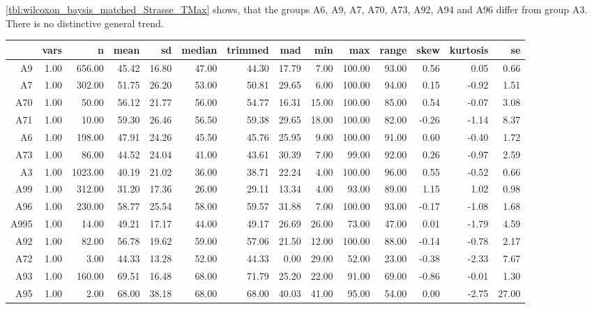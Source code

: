 \cref{tbl:wilcoxon_baysis_matched_Strasse_TMax} shows, that the groups A6, A9, A7, A70, A73, A92, A94 and A96 differ from group A3. There is no distinctive general trend.
\begin{table}[ht!]
	\tiny
	\centering
  \begin{tabular}{rrrrrrrrrrrrrr}
    \hline
    & vars & n & mean & sd & median & trimmed & mad & min & max & range & skew & kurtosis & se \\ 
    \hline
    A9   & 1.00 & 656.00 & 45.42 & 16.80 & 47.00 & 44.30 & 17.79 & 7.00 & 100.00 & 93.00 & 0.56 & 0.05 & 0.66 \\ 
    A7   & 1.00 & 302.00 & 51.75 & 26.20 & 53.00 & 50.81 & 29.65 & 6.00 & 100.00 & 94.00 & 0.15 & -0.92 & 1.51 \\ 
    A70  & 1.00 & 50.00 & 56.12 & 21.77 & 56.00 & 54.77 & 16.31 & 15.00 & 100.00 & 85.00 & 0.54 & -0.07 & 3.08 \\ 
    A71  & 1.00 & 10.00 & 59.30 & 26.46 & 56.50 & 59.38 & 29.65 & 18.00 & 100.00 & 82.00 & -0.26 & -1.14 & 8.37 \\ 
    A6   & 1.00 & 198.00 & 47.91 & 24.26 & 45.50 & 45.76 & 25.95 & 9.00 & 100.00 & 91.00 & 0.60 & -0.40 & 1.72 \\ 
    A73  & 1.00 & 86.00 & 44.52 & 24.04 & 41.00 & 43.61 & 30.39 & 7.00 & 99.00 & 92.00 & 0.26 & -0.97 & 2.59 \\ 
    A3   & 1.00 & 1023.00 & 40.19 & 21.02 & 36.00 & 38.71 & 22.24 & 4.00 & 100.00 & 96.00 & 0.55 & -0.52 & 0.66 \\ 
    A99  & 1.00 & 312.00 & 31.20 & 17.36 & 26.00 & 29.11 & 13.34 & 4.00 & 93.00 & 89.00 & 1.15 & 1.02 & 0.98 \\ 
    A96  & 1.00 & 230.00 & 58.77 & 25.54 & 58.00 & 59.57 & 31.88 & 7.00 & 100.00 & 93.00 & -0.17 & -1.08 & 1.68 \\ 
    A995 & 1.00 & 14.00 & 49.21 & 17.17 & 44.00 & 49.17 & 26.69 & 26.00 & 73.00 & 47.00 & 0.01 & -1.79 & 4.59 \\ 
    A92  & 1.00 & 82.00 & 56.78 & 19.62 & 59.00 & 57.06 & 21.50 & 12.00 & 100.00 & 88.00 & -0.14 & -0.78 & 2.17 \\ 
    A72  & 1.00 & 3.00 & 44.33 & 13.28 & 52.00 & 44.33 & 0.00 & 29.00 & 52.00 & 23.00 & -0.38 & -2.33 & 7.67 \\ 
    A93  & 1.00 & 160.00 & 69.51 & 16.48 & 68.00 & 71.79 & 25.20 & 22.00 & 91.00 & 69.00 & -0.86 & -0.01 & 1.30 \\ 
    A95  & 1.00 & 2.00 & 68.00 & 38.18 & 68.00 & 68.00 & 40.03 & 41.00 & 95.00 & 54.00 & 0.00 & -2.75 & 27.00 \\ 

\end{tabular}
\end{table}
